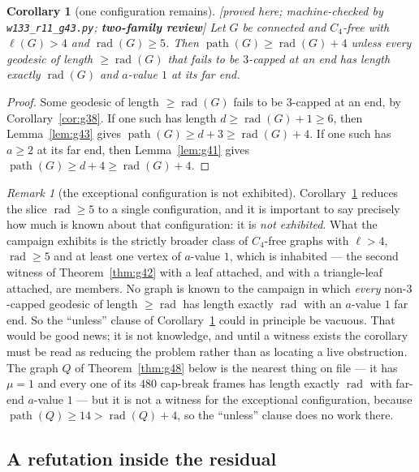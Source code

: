 \documentclass[11pt]{article}
\theoremstyle{plain}
\newtheorem{corollary}[theorem]{Corollary}
\theoremstyle{definition}
\theoremstyle{remark}
\newtheorem{remark}[theorem]{Remark}
\numberwithin{equation}{section}
\newcommand{\rad}{\operatorname{rad}}
\newcommand{\pth}{\operatorname{path}}
\newcommand{\statusbox}[1]{{\small\sloppy\textsf{[#1]}}}
\newcommand{\REV}[1]{\statusbox{proved here; machine-checked by \texttt{#1};
\textbf{two-family review}}}
\begin{document}
\begin{corollary}[one configuration remains]\label{cor:g44}
\REV{w133\_r11\_g43.py}
Let $G$ be connected and $C_4$-free with $\ell(G)>4$ and $\rad(G)\ge 5$. Then
$\pth(G)\ge \rad(G)+4$ unless every geodesic of length $\ge \rad(G)$ that fails to be
$3$-capped at an end has length exactly $\rad(G)$ \emph{and} $a$-value $1$ at its far end.
\end{corollary}

\begin{proof}
Some geodesic of length $\ge \rad(G)$ fails to be $3$-capped at an end, by
Corollary~\ref{cor:g38}. If one such has length $d \ge \rad(G)+1\ge 6$, then
Lemma~\ref{lem:g43} gives $\pth(G)\ge d+3\ge \rad(G)+4$. If one such has $a\ge 2$ at its far
end, then Lemma~\ref{lem:g41} gives $\pth(G)\ge d+4\ge \rad(G)+4$.
\end{proof}

\begin{remark}[the exceptional configuration is not exhibited]\label{rem:nonexhibited}
Corollary~\ref{cor:g44} reduces the slice $\rad \ge 5$ to a single configuration, and it is
important to say precisely how much is known about that configuration: it is \emph{not
exhibited}. What the campaign exhibits is the strictly broader class of $C_4$-free graphs with
$\ell > 4$, $\rad \ge 5$ and at least one vertex of $a$-value $1$, which is inhabited --- the
second witness of Theorem~\ref{thm:g42} with a leaf attached, and with a triangle-leaf
attached, are members. No graph is known to the campaign in which \emph{every} non-$3$-capped
geodesic of length $\ge \rad$ has length exactly $\rad$ with an $a$-value $1$ far end. So the
``unless'' clause of Corollary~\ref{cor:g44} could in principle be vacuous. That would be good
news; it is not knowledge, and until a witness exists the corollary must be read as reducing
the problem rather than as locating a live obstruction. The graph $Q$ of
Theorem~\ref{thm:g48} below is the nearest thing on file --- it has $\mu = 1$ and every one of
its $480$ cap-break frames has length exactly $\rad$ with far-end $a$-value $1$ --- but it is
not a witness for the exceptional configuration, because $\pth(Q)\ge 14 > \rad(Q)+4$, so the
``unless'' clause does no work there.
\end{remark}

\subsection{A refutation inside the residual}
\end{document}
